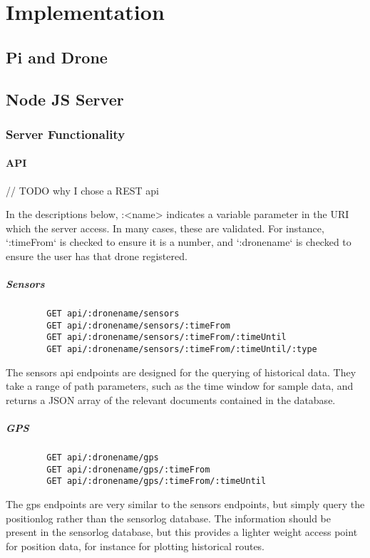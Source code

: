 \documentclass{article}
\begin{document}
\section{Implementation}
\subsection{Pi and Drone}
\subsection{Node JS Server}


\subsubsection{Server Functionality}

\paragraph{API}
// TODO why I chose a REST api

In the descriptions below, :<name> indicates a variable parameter in the URI which the server access. In many cases, these are validated. For instance, `:timeFrom` is checked to ensure it is a number, and `:dronename` is checked to ensure the user has that drone registered. \cite{router}
\subparagraph{Sensors}
\begin{center}
	\begin{lstlisting}
		GET api/:dronename/sensors
		GET api/:dronename/sensors/:timeFrom
		GET api/:dronename/sensors/:timeFrom/:timeUntil
		GET api/:dronename/sensors/:timeFrom/:timeUntil/:type
	\end{lstlisting}
\end{center}
The sensors api endpoints are designed for the querying of historical data. They take a range of path parameters, such as the time window for sample data, and returns a JSON array of the relevant documents contained in the database.

\subparagraph{GPS}
\begin{center}
	\begin{lstlisting}
		GET api/:dronename/gps
		GET api/:dronename/gps/:timeFrom
		GET api/:dronename/gps/:timeFrom/:timeUntil
	\end{lstlisting}
\end{center}
The gps endpoints are very similar to the sensors endpoints, but simply query the positionlog rather than the sensorlog database. The information should be present in the sensorlog database, but this provides a lighter weight access point for position data, for instance for plotting historical routes. 
\end{document}
